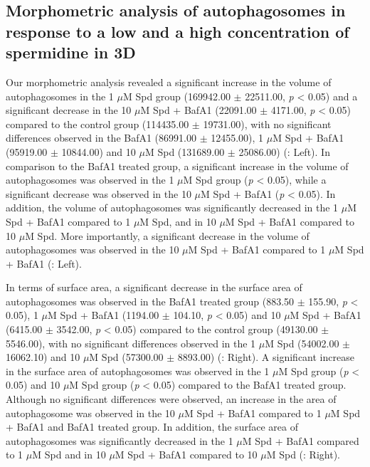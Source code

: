 \subsection{Morphometric analysis of autophagosomes in response to a low and a high concentration of spermidine in 3D}
Our morphometric analysis revealed a significant increase in the volume of autophagosomes in the 1 $\mu$M Spd group (169942.00 $\pm$ 22511.00, \textit{p} < 0.05) and a significant decrease in the 10 $\mu$M Spd + BafA1 (22091.00 $\pm$ 4171.00, \textit{p} < 0.05) compared to the control group (114435.00 $\pm$ 19731.00), with no significant differences observed in the BafA1 (86991.00 $\pm$ 12455.00), 1 $\mu$M Spd + BafA1 (95919.00 $\pm$ 10844.00) and 10 $\mu$M Spd (131689.00 $\pm$ 25086.00) (: Left). In comparison to the BafA1 treated group, a significant increase in the volume of autophagosomes was observed in the 1 $\mu$M Spd group (\textit{p} < 0.05), while a significant decrease was observed in the 10 $\mu$M Spd + BafA1 (\textit{p} < 0.05). In addition, the volume of autophagosomes was significantly decreased in the 1 $\mu$M Spd + BafA1 compared to 1 $\mu$M Spd, and in 10 $\mu$M Spd + BafA1 compared to 10 $\mu$M Spd. More importantly, a significant decrease in the volume of autophagosomes was observed in the 10 $\mu$M Spd + BafA1 compared to 1 $\mu$M Spd + BafA1 (: Left). 

In terms of surface area, a significant decrease in the surface area of autophagosomes was observed in the BafA1 treated group (883.50 $\pm$ 155.90, \textit{p} < 0.05), 1 $\mu$M Spd + BafA1 (1194.00 $\pm$ 104.10, \textit{p} < 0.05) and 10 $\mu$M Spd + BafA1 (6415.00 $\pm$ 3542.00, \textit{p} < 0.05) compared to the control group (49130.00 $\pm$ 5546.00), with no significant differences observed in the 1 $\mu$M Spd (54002.00 $\pm$ 16062.10) and 10 $\mu$M Spd (57300.00 $\pm$ 8893.00) (: Right). A significant increase in the surface area of autophagosomes was observed in the 1 $\mu$M Spd group (\textit{p} < 0.05) and 10 $\mu$M Spd group (\textit{p} < 0.05) compared to the BafA1 treated group. Although no significant differences were observed, an increase in the area of autophagosome was observed in the 10 $\mu$M Spd + BafA1 compared to 1 $\mu$M Spd + BafA1 and BafA1 treated group. In addition, the surface area of autophagosomes was significantly decreased in the 1 $\mu$M Spd + BafA1 compared to 1 $\mu$M Spd and in 10 $\mu$M Spd + BafA1 compared to 10 $\mu$M Spd (: Right). 

